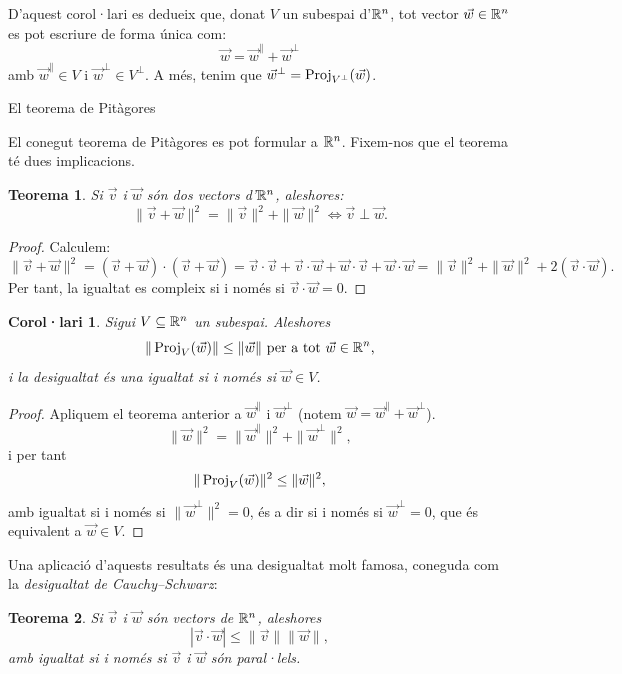 \documentclass[
  11pt,
]{book}
\makeatletter
\numberwithin{dummy}{section}
\theoremstyle{maincolornumbox}
\newtheorem{theorem}{TTTT}[chapter]
\newtheorem{theoremeT}{Teorema}[chapter]
\theoremstyle{blacknumex}
\theoremstyle{blacknumbox}
\newtheorem{corollaryT}{Corol·lari}[chapter]
\theoremstyle{maincolornum}
\renewenvironment{theorem}{\begin{tBox}\begin{theoremeT}}{\end{theoremeT}\end{tBox}}
\newenvironment{corollary}{\begin{cBox}\begin{corollaryT}}{\end{corollaryT}\end{cBox}}
\renewcommand{\section}{\@startsection{section}{1}{\z@}
{-4ex \@plus -1ex \@minus -.4ex}
{1ex \@plus.2ex }
{\normalfont\large\sffamily\bfseries}}
\newlength\esp
\makeatother
\begin{document}
D'aquest corol·lari es dedueix que, donat \(V\) un subespai d'\(\mathbb{R}^n\), tot
vector \(\vec w\in\mathbb{R}^n\) es pot escriure de forma única com:
\[\vec w = \vec w^\parallel + \vec w^\perp\] amb
\(\vec w^\parallel \in V\) i \(\vec w^\perp \in V^\perp\). A més, tenim que
\(\vec w^\perp=\operatorname{Proj}_{V^\perp}(\vec w)\).

\hypertarget{el-teorema-de-pituxe0gores}{%
\section{El teorema de Pitàgores}\label{el-teorema-de-pituxe0gores}}

El conegut teorema de Pitàgores es pot formular a \(\mathbb{R}^n\). Fixem-nos que
el teorema té dues implicacions.

\begin{theorem}
Si \(\vec v\) i \(\vec w\) són dos vectors d'\(\mathbb{R}^n\), aleshores:
\[\| \vec v + \vec w \|^2 = \|\vec v\|^2 + \|\vec  w\|^2 \iff \vec v \perp \vec w.\]
\end{theorem}

\begin{proof}
Calculem:
\[\| \vec v + \vec w\|^2 = (\vec v+\vec w)\cdot (\vec v+\vec w) = \vec v\cdot \vec v + \vec v\cdot \vec w + \vec w\cdot \vec v + \vec w\cdot \vec w=\|\vec v\|^2 + \|\vec w\|^2 +2(\vec v\cdot \vec w).\]
Per tant, la igualtat es compleix si i només si
\(\vec v\cdot \vec w = 0\).
\end{proof}

\begin{corollary}
Sigui \(V\subseteq \mathbb{R}^n\) un subespai. Aleshores
\[\|\operatorname{Proj}_V(\vec w)\| \leq \| \vec w\| \text{ per a tot $\vec w\in\mathbb{R}^n$,}\]
i la desigualtat és una igualtat si i només si \(\vec w\in V\).
\end{corollary}

\begin{proof}
Apliquem el teorema anterior a \(\vec w^\parallel\) i
\(\vec w^\perp\) (notem \(\vec w = \vec w^\parallel + \vec w^\perp\)).
\[\|\vec w\|^2 = \|\vec w^\parallel\|^2 + \|\vec w^\perp\|^2,\] i per
tant \[\|\operatorname{Proj}_V(\vec w)\|^2 \leq \|\vec w\|^2,\] amb igualtat si i
només si \(\|\vec w^\perp\|^2 = 0\), és a dir si i només si
\(\vec w^\perp = 0\), que és equivalent a \(\vec w\in V\).
\end{proof}

Una aplicació d'aquests resultats és una desigualtat molt famosa,
coneguda com la \emph{desigualtat de Cauchy--Schwarz}:

\begin{theorem}
Si \(\vec v\) i \(\vec w\) són vectors de \(\mathbb{R}^n\), aleshores
\[|\vec v\cdot \vec w|\leq \|\vec v\|\|\vec w\|,\] amb igualtat si i
només si \(\vec v\) i \(\vec w\) són paral·lels.
\end{theorem}
\end{document}
